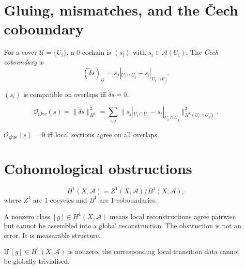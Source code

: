 \section{Gluing, mismatches, and the Čech coboundary}

\begin{definition}
  \label{def:cech}
  For a cover $\mathcal{U} = \{U_i\}$, a $0$-cochain is
  $(s_i)$ with $s_i \in \mathcal{A}(U_i)$.
  The \emph{Čech coboundary} is
  \[
    (\check{\delta}s)_{ij}
    = s_j|_{U_i \cap U_j} - s_i|_{U_i \cap U_j}.
  \]
\end{definition}

\begin{proposition}[Vanishing coboundary $=$ compatibility]
  \statusproven{}
  $(s_i)$ is compatible on overlaps iff $\check{\delta}s = 0$.
\end{proposition}

\begin{definition}
  \label{def:gluing-penalty}
  \[
    \mathcal{O}_{\mathrm{glue}}(s)
    = \|\check{\delta}s\|_{H^k}^2
    = \sum_{i,j}
    \|s_j|_{U_i\cap U_j} - s_i|_{U_i\cap U_j}\|_{H^k(U_i\cap U_j)}^2.
  \]
\end{definition}

\begin{proposition}
  \statusproven{}
  $\mathcal{O}_{\mathrm{glue}}(s) = 0$ iff local sections
  agree on all overlaps.
\end{proposition}

\section{Cohomological obstructions}

\begin{definition}
  \[
    H^1(X, \mathcal{A})
    = Z^1(X,\mathcal{A}) / B^1(X,\mathcal{A}),
  \]
  where $Z^1$ are $1$-cocycles and $B^1$ are $1$-coboundaries.
\end{definition}

\begin{ObstructionBox}
  A nonzero class $[g] \in H^1(X, \mathcal{A})$ means local
  reconstructions agree pairwise but cannot be assembled into
  a global reconstruction.
  The obstruction is not an error.
  It is measurable structure.
\end{ObstructionBox}

\begin{proposition}
  \label{prop:h1-obstruction}
  \statusproven{}
  If $[g] \in H^1(X, \mathcal{A})$ is nonzero, the
  corresponding local transition data cannot be globally
  trivialised.
\end{proposition}


